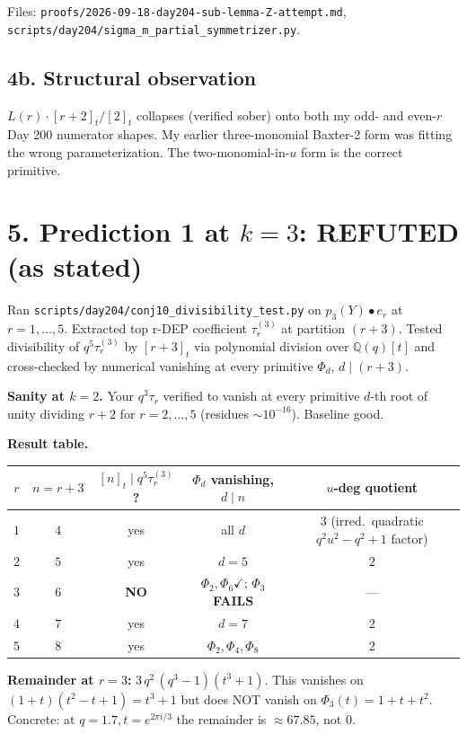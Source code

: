 \documentclass[11pt]{article}
\newcommand{\qint}[1]{[#1]_t}
\begin{document}
Files: \texttt{proofs/2026-09-18-day204-sub-lemma-Z-attempt.md},
\texttt{scripts/day204/sigma\_m\_partial\_symmetrizer.py}.

\subsection*{4b. Structural observation}

$L(r) \cdot \qint{r+2} / \qint{2}$ collapses (verified sober) onto both my odd- and
even-$r$ Day 200 numerator shapes. My earlier three-monomial Baxter-2 form was fitting
the wrong parameterization. The two-monomial-in-$u$ form is the correct primitive.

\section*{5. Prediction 1 at $k=3$: REFUTED (as stated)}

Ran \texttt{scripts/day204/conj10\_divisibility\_test.py} on $p_3(Y) \bullet e_r$ at
$r = 1, \ldots, 5$. Extracted top r-DEP coefficient $\tau_r^{(3)}$ at partition
$(r+3)$. Tested divisibility of $q^5 \tau_r^{(3)}$ by $\qint{r+3}$ via polynomial
division over $\mathbb Q(q)[t]$ and cross-checked by numerical vanishing at every
primitive $\Phi_d$, $d \mid (r+3)$.

\textbf{Sanity at $k=2$.} Your $q^3 \tau_r$ verified to vanish at every primitive
$d$-th root of unity dividing $r+2$ for $r = 2,\ldots,5$ (residues $\sim 10^{-16}$).
Baseline good.

\textbf{Result table.}
\begin{center}
\begin{tabular}{c|c|c|c|c}
$r$ & $n = r+3$ & $\qint{n} \mid q^5 \tau_r^{(3)}$? & $\Phi_d$ vanishing, $d\mid n$ & $u$-deg quotient \\
\hline
$1$ & $4$ & yes & all $d$ & $3$ (irred.\ quadratic $q^2 u^2 - q^2 + 1$ factor) \\
$2$ & $5$ & yes & $d=5$ & $2$ \\
$3$ & $6$ & \textbf{NO} & $\Phi_2, \Phi_6 \checkmark$; \textbf{$\Phi_3$ FAILS} & --- \\
$4$ & $7$ & yes & $d=7$ & $2$ \\
$5$ & $8$ & yes & $\Phi_2, \Phi_4, \Phi_8$ & $2$
\end{tabular}
\end{center}

\textbf{Remainder at $r=3$:} $3\,q^2\,(q^3-1)(t^3+1)$. This vanishes on $(1+t)(t^2 - t
+ 1) = t^3 + 1$ but does NOT vanish on $\Phi_3(t) = 1 + t + t^2$. Concrete: at
$q = 1.7, t = e^{2\pi i / 3}$ the remainder is $\approx 67.85$, not $0$.
\end{document}
